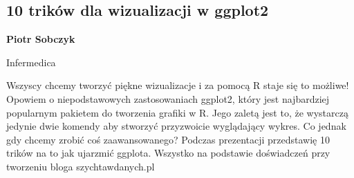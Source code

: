 \documentclass[\main/boa.tex]{subfiles}
\begin{document}
\subsection{10 trików dla wizualizacji w ggplot2 }

\begin{minipage}{0.915\textwidth}
	\centering
  {\bf {} Piotr Sobczyk}
\end{minipage}

\vskip 0.3cm

\begin{affiliations}
\begin{minipage}{0.915\textwidth}
\centering
Infermedica  \\[-2pt]
\end{minipage}
\end{affiliations}

\vskip 0.8cm

 Wszyscy chcemy tworzyć piękne wizualizacje i za pomocą R staje się to możliwe! Opowiem o niepodstawowych zastosowaniach ggplot2, który jest najbardziej popularnym pakietem do tworzenia grafiki w R. Jego zaletą jest to, że wystarczą jedynie dwie komendy aby stworzyć przyzwoicie wyglądający wykres. Co jednak gdy chcemy zrobić coś zaawansowanego? Podczas prezentacji przedstawię 10 trików na to jak ujarzmić ggplota. Wszystko na podstawie doświadczeń przy tworzeniu bloga szychtawdanych.pl 
\end{document}
